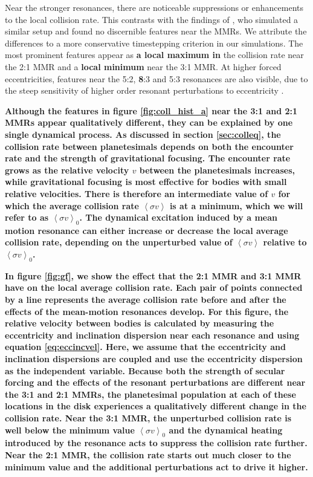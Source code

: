 \documentclass[fleqn,usenatbib]{mnras}
\begin{document}
Near the stronger resonances, there are noticeable suppressions or enhancements to the local collision rate. This contrasts with the findings of 
\citet{2000Icar..143...45R}, who simulated a similar setup and found no discernible features near the MMRs. We attribute the differences to a more 
conservative timestepping criterion in our simulations. The most prominent features appear as \textbf{a local maximum in} the collision rate near the 2:1 
MMR and a \textbf{local minimum} near the 3:1 MMR. At higher forced eccentricities, features near the 5:2, \textbf{8}:3 and 5:3 resonances are also visible, due to the 
steep sensitivity of higher order resonant perturbations to eccentricity \citep{1994PhyD...77..289M}.

\textbf{Although the features in figure \ref{fig:coll_hist_a} near the 3:1 and 2:1 MMRs appear qualitatively different, they can be explained by one single dynamical process. As discussed in section \ref{sec:colleq}, the collision rate between planetesimals depends on both the encounter rate and the strength of gravitational focusing. The encounter rate grows as the relative velocity $v$ between the planetesimals increases, while gravitational focusing is most effective for bodies with small relative velocities. There is therefore an intermediate value of $v$ for which the average collision rate $\left< \sigma v \right>$ is at a minimum, which we will refer to as  $\left< \sigma v \right>_{0}$. The dynamical excitation induced by a mean motion resonance can either increase or decrease the local average collision rate, depending on the unperturbed value of  $\left< \sigma v \right>$ relative to  $\left< \sigma v \right>_{0}$.}

\textbf{In figure \ref{fig:gf}, we show the effect that the 2:1 MMR and 3:1 MMR have on the local average collision rate. Each pair of points connected by a line represents the average collision rate before and after the effects of the mean-motion resonances develop. For this figure, the relative velocity between bodies is calculated by measuring the eccentricity and inclination dispersion near each resonance and using equation \ref{eq:eccincvel}. Here, we assume that the eccentricity and inclination dispersions are coupled \citep{1993MNRAS.263..875I} and use the eccentricity dispersion as the independent variable. Because both the strength of secular forcing and the effects of the resonant perturbations are different near the 3:1 and 2:1 MMRs, the planetesimal population at each of these locations in the disk experiences a qualitatively different change in the collision rate. Near the 3:1 MMR, the unperturbed collision rate is well below the minimum value $\left< \sigma v \right>_{0}$ and the dynamical heating introduced by the resonance acts to suppress the collision rate further. Near the 2:1 MMR, the collision rate starts out much closer to the minimum value and the additional perturbations act to drive it higher.}
\end{document}
